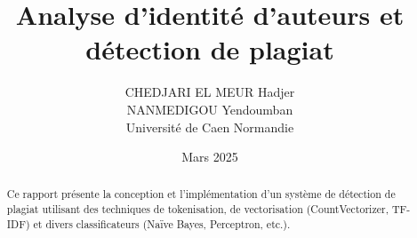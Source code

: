 \documentclass[a4paper,12pt]{article}
\title{Analyse d'identité d'auteurs et détection de plagiat}
\author{CHEDJARI EL MEUR Hadjer \\ NANMEDIGOU Yendoumban\\ Université de Caen Normandie}
\date{Mars 2025}
\begin{document}
\maketitle
\begin{abstract}
Ce rapport présente la conception et l'implémentation d'un système de détection de plagiat utilisant des techniques de tokenisation, de vectorisation (CountVectorizer, TF-IDF) et divers classificateurs (Naïve Bayes, Perceptron, etc.).
\end{abstract}

\tableofcontents







\end{document}
